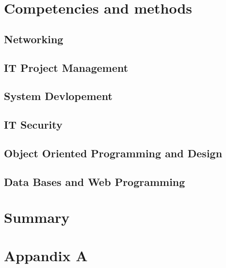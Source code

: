 \documentclass[11pt]{article}
\begin{document}
\section{Competencies and methods}
\subsection{Networking}
\subsection{IT Project Management}
\subsection{System Devlopement}
\subsection{IT Security}
\subsection{Object Oriented Programming and Design}
\subsection{Data Bases and Web Programming }
\section{Summary}
\newpage
\section{Appandix A}
\end{document}

